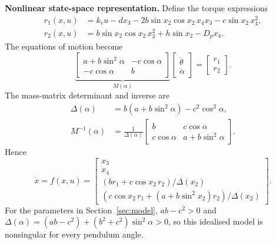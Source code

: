 \textbf{Nonlinear state-space representation.}
Define the torque expressions
\begin{align}
r_1(x,u)&=k_vu-dx_3-2b\sin x_2\cos x_2\,x_4x_3-c\sin x_2\,x_4^2,\\
r_2(x,u)&=b\sin x_2\cos x_2\,x_3^2+h\sin x_2-D_px_4.
\end{align}
The equations of motion become
\begin{equation}
\underbrace{\begin{bmatrix}
a+b\sin^2\alpha&-c\cos\alpha\\-c\cos\alpha&b
\end{bmatrix}}_{M(\alpha)}
\begin{bmatrix}\ddot\theta\\\ddot\alpha\end{bmatrix}
=\begin{bmatrix}r_1\\r_2\end{bmatrix}.
\end{equation}
The mass-matrix determinant and inverse are
\begin{align}
\Delta(\alpha)&=b(a+b\sin^2\alpha)-c^2\cos^2\alpha,\\
M^{-1}(\alpha)&=\frac1{\Delta(\alpha)}
\begin{bmatrix}b&c\cos\alpha\\c\cos\alpha&a+b\sin^2\alpha\end{bmatrix}.
\end{align}
Hence
\begin{equation}\label{eq:nonlinear_ss}
\boxed{\dot x=f(x,u)=
\begin{bmatrix}
x_3\\x_4\\
(br_1+c\cos x_2\,r_2)/\Delta(x_2)\\
(c\cos x_2\,r_1+(a+b\sin^2x_2)r_2)/\Delta(x_2)
\end{bmatrix}.}
\end{equation}
For the parameters in Section~\ref{sec:model}, $ab-c^2>0$ and
$\Delta(\alpha)=(ab-c^2)+(b^2+c^2)\sin^2\alpha>0$, so this idealised
model is nonsingular for every pendulum angle.

